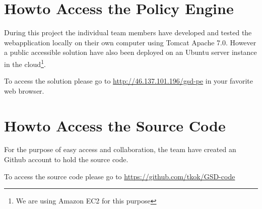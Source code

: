 \section{Howto Access the Policy Engine} \label{sec:howto-policy-engine}
During this project the individual team members have developed and tested the webapplication locally on their own computer using Tomcat Apache 7.0. However a public accessible solution have also been deployed on an Ubuntu server instance in the cloud\footnote{We are using Amazon EC2 for this purpose}.

To access the solution please go to \url{http://46.137.101.196/gsd-pe} in your favorite web browser.

\section{Howto Access the Source Code} \label{sec:howto-access-code}
For the purpose of easy access and collaboration, the team have created an Github account to hold the source code.

To access the source code please go to \url{https://github.com/tkok/GSD-code}